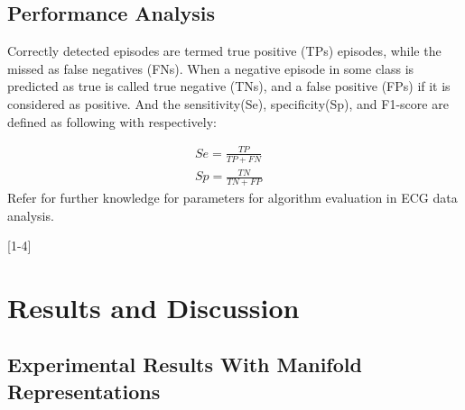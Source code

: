 \documentclass[journal]{IEEEtran}
\begin{document}
%
%                
%
     


%
%

\subsection{Performance Analysis}
Correctly detected episodes are termed true positive (TPs) episodes, while the missed as false negatives (FNs).
When a negative episode in some class is predicted as true is called true negative (TNs), and a false positive (FPs) if it is considered as positive. And the sensitivity(Se), specificity(Sp), and F1-score are defined as following with respectively:

\begin{equation}
\begin{split}
Se = \frac{TP}{TP+FN} \quad \\
 Sp = \frac{TN}{TN+FP}
\end{split}
\end{equation}
Refer \cite{mar} for further knowledge for parameters for algorithm evaluation in ECG data analysis.

[1-4]

%
%


\section{Results and Discussion}


\subsection{Experimental Results With Manifold Representations}
\end{document}
